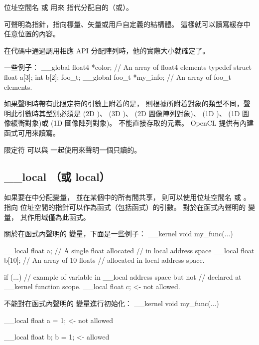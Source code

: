 位址空間名  或  用來
指代分配自的（或）。

 可聲明為指針，指向標量、矢量或用戶自定義的結構體。
這樣就可以讀寫緩存中任意位置的內容。

在代碼中通過調用相應 API 分配陣列時，他的實際大小就確定了。

一些例子：
\startclc
__global float4	*color;		// An array of float4 elements
typedef struct {
	float	a[3];
	int	b[2];
} foo_t;
__global foo_t	*my_info;	// An array of foo_t elements.
\stopclc

如果聲明時帶有此限定符的引數上附着的是，
則根據所附着對象的類型不同，聲明此引數時其型別必須是
  (2D )、  (3D )、
  (2D 圖像陣列對象)、  (1D )、
  (1D 圖像緩衝對象)或  (1D 圖像陣列對象)。
不能直接存取的元素。 OpenCL 提供有內建函式可用來讀寫。

限定符  可以與  一起使用來聲明一個只讀的。

\subsection{__local （或 local）}

如果要在中分配變量，
並在某個中的所有間共享，
則可以使用位址空間名  或 。
指向  位址空間的指針可以作為函式（包括函式）的引數。
對於在函式內聲明的  變量，
其作用域僅為此函式。

關於在函式內聲明的  變量，下面是一些例子：
\startclc
__kernel void my_func(...)
{
	__local float	a;	// A single float allocated
				// in local address space
	__local float	b[10];	// An array of 10 floats
				// allocated in local address space.

	if (...)
	{
		// example of variable in __local address space but not
		// declared at __kernel function scope.
		__local float	c;	<- not allowed.
	}
}
\stopclc

不能對在函式內聲明的  變量進行初始化：
\startclc
__kernel void my_func(...)
{
	__local float	a = 1;	<- not allowed

	__local float	b;
	b = 1;			<- allowed
}
\stopclc

